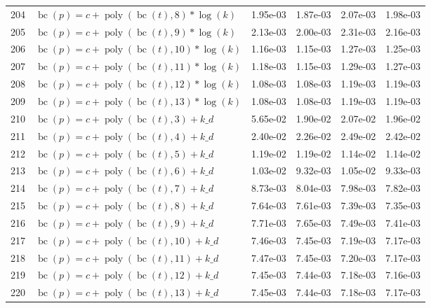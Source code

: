 \documentclass[12pt,a4paper]{article}
\DeclareMathOperator{\bc}{bc}
\DeclareMathOperator{\poly}{poly}
\begin{document}
\begin{longtable}[t]{ll>{\raggedleft\arraybackslash}p{2cm}>{\raggedleft\arraybackslash}p{2cm}>{\raggedleft\arraybackslash}p{2cm}>{\raggedleft\arraybackslash}p{2cm}}
204 & $\bc(p) = c + \poly\left( \bc(t), 8 \right) * \log(k)$ & 1.95e-03 & 1.87e-03 & 2.07e-03 & 1.98e-03\\
\rowcolor{gray!6}  205 & $\bc(p) = c + \poly\left( \bc(t), 9 \right) * \log(k)$ & 2.13e-03 & 2.00e-03 & 2.31e-03 & 2.16e-03\\
206 & $\bc(p) = c + \poly\left( \bc(t), 10 \right) * \log(k)$ & 1.16e-03 & 1.15e-03 & 1.27e-03 & 1.25e-03\\
\rowcolor{gray!6}  207 & $\bc(p) = c + \poly\left( \bc(t), 11 \right) * \log(k)$ & 1.18e-03 & 1.15e-03 & 1.29e-03 & 1.27e-03\\
208 & $\bc(p) = c + \poly\left( \bc(t), 12 \right) * \log(k)$ & 1.08e-03 & 1.08e-03 & 1.19e-03 & 1.19e-03\\
\rowcolor{gray!6}  209 & $\bc(p) = c + \poly\left( \bc(t), 13 \right) * \log(k)$ & 1.08e-03 & 1.08e-03 & 1.19e-03 & 1.19e-03\\
210 & $\bc(p) = c + \poly\left( \bc(t), 3 \right) + k\_d$ & 5.65e-02 & 1.90e-02 & 2.07e-02 & 1.96e-02\\
\rowcolor{gray!6}  211 & $\bc(p) = c + \poly\left( \bc(t), 4 \right) + k\_d$ & 2.40e-02 & 2.26e-02 & 2.49e-02 & 2.42e-02\\
212 & $\bc(p) = c + \poly\left( \bc(t), 5 \right) + k\_d$ & 1.19e-02 & 1.19e-02 & 1.14e-02 & 1.14e-02\\
\rowcolor{gray!6}  213 & $\bc(p) = c + \poly\left( \bc(t), 6 \right) + k\_d$ & 1.03e-02 & 9.32e-03 & 1.05e-02 & 9.33e-03\\
214 & $\bc(p) = c + \poly\left( \bc(t), 7 \right) + k\_d$ & 8.73e-03 & 8.04e-03 & 7.98e-03 & 7.82e-03\\
\rowcolor{gray!6}  215 & $\bc(p) = c + \poly\left( \bc(t), 8 \right) + k\_d$ & 7.64e-03 & 7.61e-03 & 7.39e-03 & 7.35e-03\\
216 & $\bc(p) = c + \poly\left( \bc(t), 9 \right) + k\_d$ & 7.71e-03 & 7.65e-03 & 7.49e-03 & 7.41e-03\\
\rowcolor{gray!6}  217 & $\bc(p) = c + \poly\left( \bc(t), 10 \right) + k\_d$ & 7.46e-03 & 7.45e-03 & 7.19e-03 & 7.17e-03\\
218 & $\bc(p) = c + \poly\left( \bc(t), 11 \right) + k\_d$ & 7.47e-03 & 7.45e-03 & 7.20e-03 & 7.17e-03\\
\rowcolor{gray!6}  219 & $\bc(p) = c + \poly\left( \bc(t), 12 \right) + k\_d$ & 7.45e-03 & 7.44e-03 & 7.18e-03 & 7.16e-03\\
220 & $\bc(p) = c + \poly\left( \bc(t), 13 \right) + k\_d$ & 7.45e-03 & 7.44e-03 & 7.18e-03 & 7.17e-03\\

\end{longtable}
\end{document}
